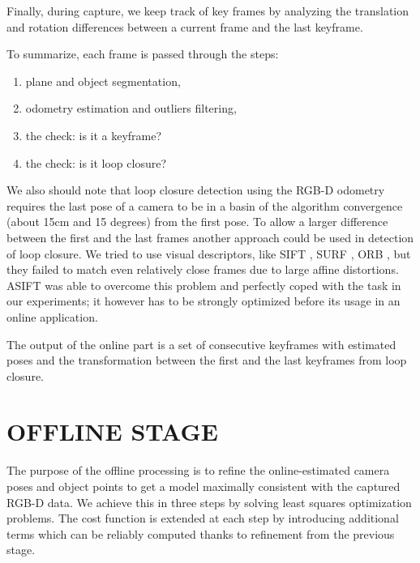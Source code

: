 \documentclass[letterpaper, 10 pt, conference]{ieeeconf}  %
\begin{document}
Finally, during capture, we keep track of key frames by analyzing the translation and rotation differences between a 
current frame and the last keyframe.

To summarize, each frame is passed through the steps:

\begin{enumerate}
 \item plane and object segmentation,
 \item odometry estimation and outliers filtering,
 \item the check: is it a keyframe?
 \item the check: is it loop closure?
\end{enumerate}

We also should note that loop closure detection using the RGB-D odometry requires
the last pose of a camera to be in a basin of
the algorithm convergence (about 15cm and 15 degrees) from the first pose. 
To allow a larger difference between the first and the last frames
another approach could be used in detection of loop closure. We tried to use visual descriptors, like
SIFT \cite{lowe2004distinctive}, SURF \cite{bay2006surf}, ORB \cite{rublee2011orb}, but they failed to match even
relatively close frames due to large affine distortions.
ASIFT \cite{morel2009asift} was able to overcome this problem
and perfectly coped with the task in our experiments;
it however has to be strongly optimized before its usage in an online application.

The output of the online part is a set of consecutive keyframes with 
estimated poses and the transformation between the first and the last 
keyframes from loop closure.


\section{OFFLINE STAGE}

\label{sec:offline}

The purpose of the offline processing is to refine the online-estimated 
camera poses and object points to get a model maximally 
consistent with the captured RGB-D data. We achieve this in three steps by 
solving least squares optimization problems. The cost function is extended at each step 
by introducing additional terms which can be reliably computed
thanks to refinement from the previous stage.

\end{document}
